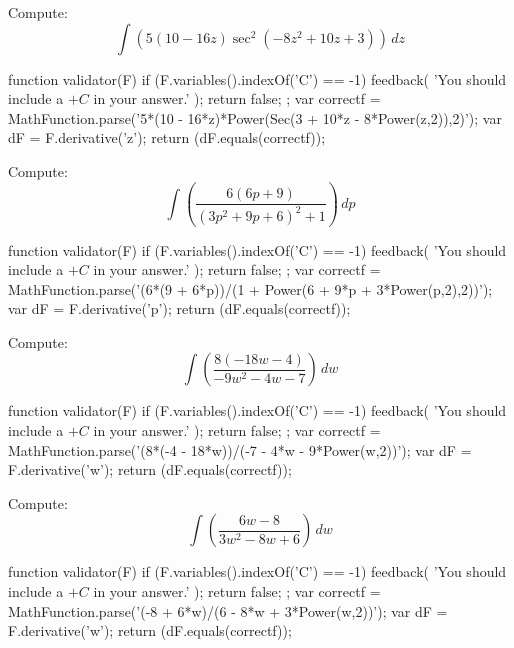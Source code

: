 \documentclass{ximera}
\renewcommand{\d}{\, d}
\begin{document}
\begin{exercise}
Compute: 
\[
\int \left(5 (10-16 z) \sec ^2\left(-8 z^2+10 z+3\right)\right)\d z
\]
\begin{expressionAnswer}
     function validator(F) {
      if (F.variables().indexOf('C') == -1) {
        feedback( 'You should include a $+C$ in your answer.' );
        return false;
      };      
      var correctf = MathFunction.parse('5*(10 - 16*z)*Power(Sec(3 + 10*z - 8*Power(z,2)),2)');
      var dF = F.derivative('z');
      return (dF.equals(correctf));
    }
\end{expressionAnswer}
\end{exercise}



\begin{exercise}
Compute: 
\[
\int \left(\frac{6 (6 p+9)}{\left(3 p^2+9 p+6\right)^2+1}\right)\d p
\]
\begin{expressionAnswer}
     function validator(F) {
      if (F.variables().indexOf('C') == -1) {
        feedback( 'You should include a $+C$ in your answer.' );
        return false;
      };      
      var correctf = MathFunction.parse('(6*(9 + 6*p))/(1 + Power(6 + 9*p + 3*Power(p,2),2))');
      var dF = F.derivative('p');
      return (dF.equals(correctf));
    }
\end{expressionAnswer}
\end{exercise}



\begin{exercise}
Compute: 
\[
\int \left(\frac{8 (-18 w-4)}{-9 w^2-4 w-7}\right)\d w
\]
\begin{expressionAnswer}
     function validator(F) {
      if (F.variables().indexOf('C') == -1) {
        feedback( 'You should include a $+C$ in your answer.' );
        return false;
      };      
      var correctf = MathFunction.parse('(8*(-4 - 18*w))/(-7 - 4*w - 9*Power(w,2))');
      var dF = F.derivative('w');
      return (dF.equals(correctf));
    }
\end{expressionAnswer}
\end{exercise}



\begin{exercise}
Compute: 
\[
\int \left(\frac{6 w-8}{3 w^2-8 w+6}\right)\d w
\]
\begin{expressionAnswer}
     function validator(F) {
      if (F.variables().indexOf('C') == -1) {
        feedback( 'You should include a $+C$ in your answer.' );
        return false;
      };      
      var correctf = MathFunction.parse('(-8 + 6*w)/(6 - 8*w + 3*Power(w,2))');
      var dF = F.derivative('w');
      return (dF.equals(correctf));
    }
\end{expressionAnswer}
\end{exercise}
\end{document}
